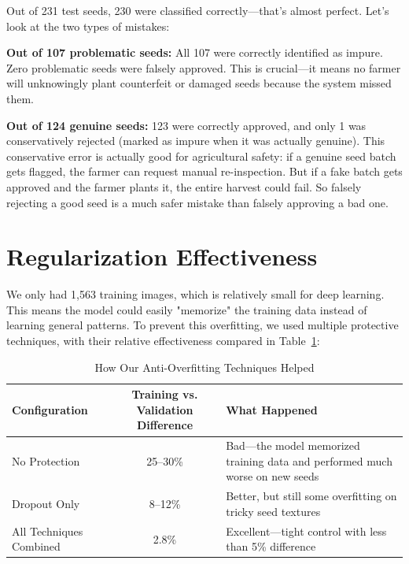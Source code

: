 Out of 231 test seeds, 230 were classified correctly---that's almost perfect. Let's look at the two types of mistakes:

\textbf{Out of 107 problematic seeds:} All 107 were correctly identified as impure. Zero problematic seeds were falsely approved. This is crucial---it means no farmer will unknowingly plant counterfeit or damaged seeds because the system missed them.

\textbf{Out of 124 genuine seeds:} 123 were correctly approved, and only 1 was conservatively rejected (marked as impure when it was actually genuine). This conservative error is actually good for agricultural safety: if a genuine seed batch gets flagged, the farmer can request manual re-inspection. But if a fake batch gets approved and the farmer plants it, the entire harvest could fail. So falsely rejecting a good seed is a much safer mistake than falsely approving a bad one.

\section{Regularization Effectiveness}

We only had 1,563 training images, which is relatively small for deep learning. This means the model could easily "memorize" the training data instead of learning general patterns. To prevent this overfitting, we used multiple protective techniques, with their relative effectiveness compared in Table~\ref{tab:regularization}:

\begin{table}[htbp]
  \centering
  \caption{How Our Anti-Overfitting Techniques Helped}
  \label{tab:regularization}
  \renewcommand{\arraystretch}{1.35}
  \begin{tabularx}{\textwidth}{@{} l c X @{}}
    \toprule
    \textbf{Configuration} & \textbf{Training vs. Validation Difference} & \textbf{What Happened} \\
    \midrule
    No Protection & 25--30\% & Bad—the model memorized training data and performed much worse on new seeds \\
    \addlinespace
    Dropout Only & 8--12\% & Better, but still some overfitting on tricky seed textures \\
    \addlinespace
    All Techniques Combined & 2.8\% & Excellent—tight control with less than 5\% difference \\
    \bottomrule
  \end{tabularx}
\end{table}


